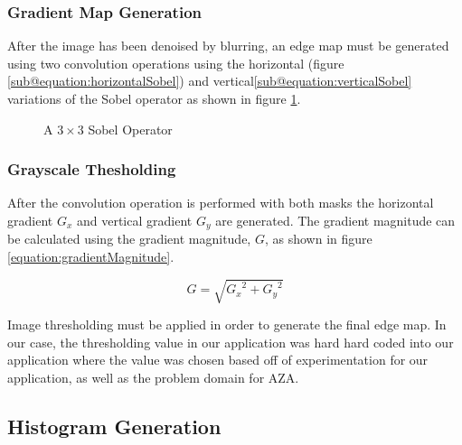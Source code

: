 \documentclass[12pt]{article}
\begin{document}
\subsubsection*{Gradient Map Generation}
After the image has been denoised by blurring, an edge map must be generated using two convolution operations using the horizontal (figure \ref{sub@equation:horizontalSobel}) and  vertical\ref{sub@equation:verticalSobel} variations of the Sobel operator as shown in figure \ref{figure:sobelOperator}.
\begin{figure} %
  \centering
  \hfil
  \caption{A $3 \times 3$ Sobel Operator}\label{figure:sobelOperator}
\end{figure}

\subsubsection*{Grayscale Thesholding}
\noindent
After the convolution operation is performed with both masks the horizontal gradient $G_x$ and vertical gradient $G_y$ are generated. 
The gradient magnitude can be calculated using the gradient magnitude, $G$, as shown in figure \ref{equation:gradientMagnitude}.

\begin{equation}
  G = \sqrt{{G_x}^2 + {G_y}^2}\label{equation:gradientMagnitude}
\end{equation}

Image thresholding must be applied in order to generate the final edge map.
In our case, the thresholding value in our application was hard hard coded into our application where the value was chosen based off of experimentation for our application, as well as the problem domain for AZA.

\subsection*{Histogram Generation}
\end{document}
